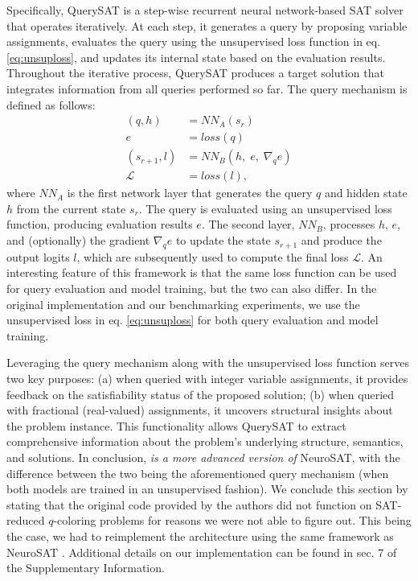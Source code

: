 \documentclass{article}
\begin{document}
Specifically, QuerySAT is a step-wise recurrent neural network-based SAT solver that operates iteratively. At each step, it generates a query by proposing variable assignments, evaluates the query using the unsupervised loss function in eq. \eqref{eq:unsuploss}, and updates its internal state based on the evaluation results. Throughout the iterative process, QuerySAT produces a target solution that integrates information from all queries performed so far. The query mechanism is defined as follows:
\begin{align*}
        (q, h) &= NN_{A}(s_{r}) \\
        e &= loss(q) \\
        (s_{r+1}, l) &= NN_{B}(h,\; e,\; \nabla_q e) \\
        \mathcal{L} &= loss(l),
\end{align*}
where \( NN_A \) is the first network layer that generates the query \( q \) and hidden state \( h \) from the current state \( s_r \). The query is evaluated using an unsupervised loss function, producing evaluation results \( e \). The second layer, \( NN_B \), processes \( h \), \( e \), and (optionally) the gradient \( \nabla_q e \) to update the state \( s_{r+1} \) and produce the output logits \( l \), which are subsequently used to compute the final loss \( \mathcal{L} \). An interesting feature of this framework is that the same loss function can be used for query evaluation and model training, but the two can also differ. In the original implementation and our benchmarking experiments, we use the unsupervised loss in eq. \eqref{eq:unsuploss} for both query evaluation and model training.

Leveraging the query mechanism along with the unsupervised loss function serves two key purposes: (a) when queried with integer variable assignments, it provides feedback on the satisfiability status of the proposed solution; (b) when queried with fractional (real-valued) assignments, it uncovers structural insights about the problem instance. This functionality allows QuerySAT to extract comprehensive information about the problem’s underlying structure, semantics, and solutions. In conclusion, \emph{ is a more advanced version of }NeuroSAT, with the difference between the two being the aforementioned query mechanism (when both models are trained in an unsupervised fashion). We conclude this section by stating that the original code provided by the authors \cite{ozolins2022goal} did not function on SAT-reduced $q$-coloring problems for reasons we were not able to figure out. This being the case, we had to reimplement the architecture using the same framework as NeuroSAT \cite{li_g4satbench_2023}. Additional details on our implementation can be found in sec. 7 of the Supplementary Information.
\end{document}
